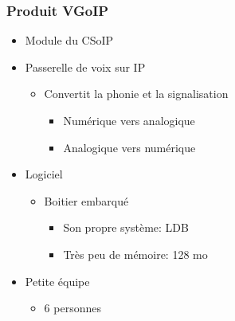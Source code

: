 \begin{frame}
    \frametitle{Produit VGoIP}
    \begin{itemize}
        \item Module du CSoIP
        \item Passerelle de voix sur IP
            \begin{itemize}
                \item Convertit la phonie et la signalisation
                    \begin{itemize}
                        \item Numérique vers analogique
                        \item Analogique vers numérique
                    \end{itemize}
            \end{itemize}
        \item Logiciel
        \begin{itemize}
            \item Boitier embarqué
                \begin{itemize}
                    \item Son propre système: LDB
                    \item Très peu de mémoire: 128 mo
                \end{itemize}
        \end{itemize}
        \item Petite équipe
            \begin{itemize}
                \item 6 personnes
            \end{itemize}
    \end{itemize}
\end{frame}